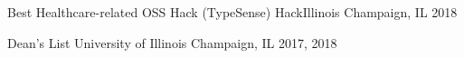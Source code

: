 


\begin{cvhonors}
	
\cvhonor
	{Best Healthcare-related OSS Hack (TypeSense)} %
	{HackIllinois} %
	{Champaign, IL} %
	{2018} %

  \cvhonor
    {Dean's List} %
    {University of Illinois} %
    {Champaign, IL} %
    {2017, 2018} %


\end{cvhonors}
